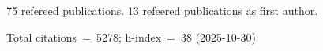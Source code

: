 75 refereed publications. 13 refeered publications as first author.

Total citations~=~5278; h-index~=~38 (2025-10-30)